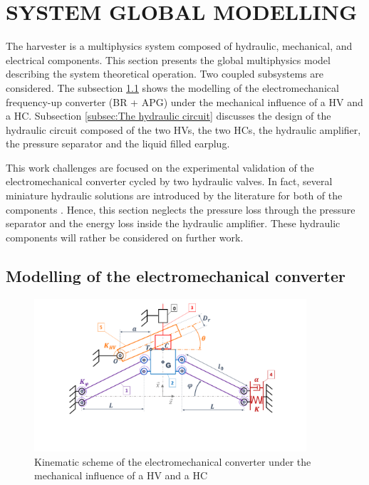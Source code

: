 \documentclass[3p,twocolumn,preprint]{elsarticle}
\begin{document}
\section{SYSTEM GLOBAL MODELLING}
\label{sec:SYSTEM MODELING}
The harvester is a multiphysics system composed of hydraulic, mechanical, and electrical components. This section presents the global multiphysics model describing the system theoretical operation. Two coupled subsystems are considered. The subsection \ref{subsec:The electromechanical converter} shows the modelling of the electromechanical frequency-up converter (BR + APG) under the mechanical influence of a HV and a HC. Subsection \ref{subsec:The hydraulic circuit} discusses the design of the hydraulic circuit composed of the two HVs, the two HCs, the hydraulic amplifier, the pressure separator and the liquid filled earplug.

This work challenges are focused on the experimental validation of the electromechanical converter cycled by two hydraulic valves. In fact, several miniature hydraulic solutions are introduced by the literature for both of the components \cite{Wang2020,Xu2021,Zhu2013}. Hence, this section neglects the pressure loss through the pressure separator and the energy loss inside the hydraulic amplifier. These hydraulic components will rather be considered on further work. 

	\subsection{Modelling of the electromechanical converter}	
	\label{subsec:The electromechanical converter}
\begin{figure}[!htbp]
	\centering
	\captionsetup{justification=centering}
	\includegraphics[trim={0cm 0cm 0cm 0cm},clip, width=0.9\textwidth]{figures/schema_cinematique1.pdf}
	\caption{Kinematic scheme of the electromechanical converter under the mechanical influence of a HV and a HC}
	\label{fig:schema_cinematique1}
\end{figure}
\end{document}
